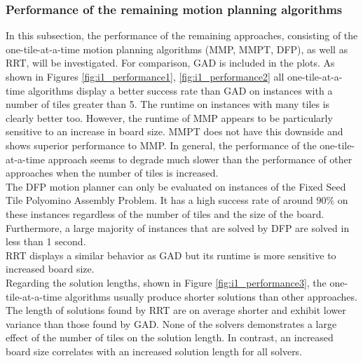 \vfill
\newpage

\subsubsection{Performance of the remaining motion planning algorithms}

In this subsection, the performance of the remaining approaches, consisting of the one-tile-at-a-time motion planning algorithms (MMP, MMPT, DFP), as well as RRT, will be investigated. For comparison, GAD is included in the plots.
As shown in Figures \ref{fig:i1_performance1}, \ref{fig:i1_performance2} all one-tile-at-a-time algorithms display a better success rate than GAD on instances with a number of tiles greater than 5. The runtime on instances with many tiles is clearly better too. However, the runtime of MMP appears to be particularly sensitive to an increase in board size.
MMPT does not have this downside and shows superior performance to MMP.
In general, the performance of the one-tile-at-a-time approach seems to degrade much slower than the performance of other approaches when the number of tiles is increased.
\\
The DFP motion planner can only be evaluated on instances of the Fixed Seed Tile Polyomino Assembly Problem. It has a high success rate of around $90\%$ on these instances regardless of the number of tiles and the size of the board. Furthermore, a large majority of instances that are solved by DFP are solved in less than 1 second. \\
RRT displays a similar behavior as GAD but its runtime is more sensitive to increased board size. \\
Regarding the solution lengths, shown in Figure \ref{fig:i1_performance3}, the one-tile-at-a-time algorithms usually produce shorter solutions than other approaches. The length of solutions found by RRT are on average shorter and exhibit lower variance than those found by GAD.
None of the solvers demonstrates a large effect of the number of tiles on the solution length. In contrast, an increased board size correlates with an increased solution length for all solvers.


